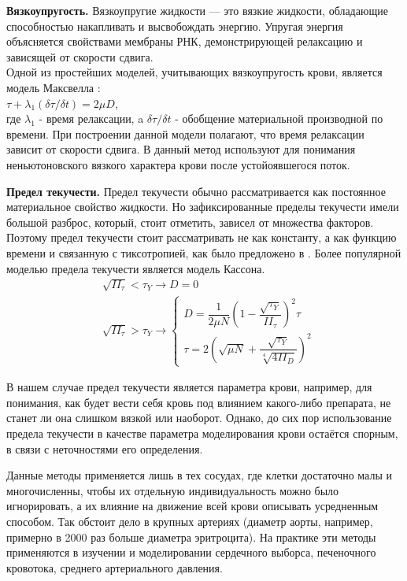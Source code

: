 \textbf{Вязкоупругость.}
Вязкоупругие жидкости — это вязкие жидкости, обладающие способностью накапливать и высвобождать энергию. Упругая энергия объясняется свойствами мембраны РНК, демонстрирующей релаксацию \cite{evans:1976} и зависящей от скорости сдвига.\\
Одной из простейших моделей, учитывающих вязкоупругость крови, является модель Максвелла \cite{thurston:1972}:\\
$\tau+\lambda_1(\delta\tau / \delta t)=2\mu D$,\\  где 
$\lambda_1$ 
- время релаксации, a 
$\delta\tau / \delta t$
- обобщение материальной производной по времени.
При построении данной модели полагают, что время релаксации зависит от скорости сдвига.
В \cite{thurston:1994} данный метод используют для понимания неньютоновского вязкого характера крови после устойоявшегося поток.

\textbf{Предел текучести.}
Предел текучести обычно рассматривается как постоянное материальное свойство жидкости. Но зафиксированные пределы текучести имели большой разброс, который, стоит отметить, зависел от множества факторов.
Поэтому предел текучести стоит рассматривать не как константу, а как функцию времени и связанную с тиксотропией, как было предложено в \cite{moller:2006}.
Более популярной моделью предела текучести является модель Кассона.
$$
\begin{aligned}
	&\sqrt{II_\tau} < \tau_Y\longrightarrow D=0 \\
	&\sqrt{II_\tau} > \tau_Y\longrightarrow
	\begin{cases}
		D   = \dfrac{1}{2\mu N}\left(1-\dfrac{\sqrt{\tau_Y}}{II_\tau}\right)^2\tau \\[10pt]
		\tau= 2\left(\sqrt{\mu N}+\dfrac{\sqrt{\tau_Y}}{\sqrt[4]{4II_D}}\right)^2
	\end{cases}
\end{aligned}
$$

В нашем случае предел текучести является параметра крови, например, для понимания, как будет вести себя кровь под влиянием какого-либо препарата, не станет ли она слишком вязкой или наоборот.
Однако, до сих пор использование предела текучести в качестве параметра моделирования крови остаётся спорным, в связи с неточностями его определения.

Данные методы применяется лишь в тех сосудах, где клетки достаточно малы и 
многочисленны, чтобы их отдельную индивидуальность можно было игнорировать, а их влияние на движение всей крови описывать усредненным способом. Так обстоит дело в крупных артериях (диаметр аорты, например, примерно в 2000 раз больше диаметра эритроцита). 
На практике эти методы применяются в изучении и моделировании сердечного выборса, печеночного кровотока, среднего артериального давления.

